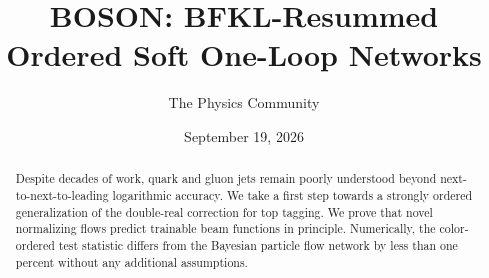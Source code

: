 \documentclass[11pt]{article}
\title{BOSON: BFKL-Resummed Ordered Soft One-Loop Networks}
\author{The Physics Community}
\date{September 19, 2026}
\numberwithin{equation}{section}
\theoremstyle{definition}
\theoremstyle{remark}
\begin{document}
\maketitle
\begin{abstract}
Despite decades of work, quark and gluon jets remain poorly understood
beyond next-to-next-to-leading logarithmic accuracy. We take a first
step towards a strongly ordered generalization of the double-real
correction for top tagging. We prove that novel normalizing flows
predict trainable beam functions in principle. Numerically, the
color-ordered test statistic differs from the Bayesian particle flow
network by less than one percent without any additional assumptions.
\end{abstract}
\tableofcontents





\nocite{*}


\end{document}
